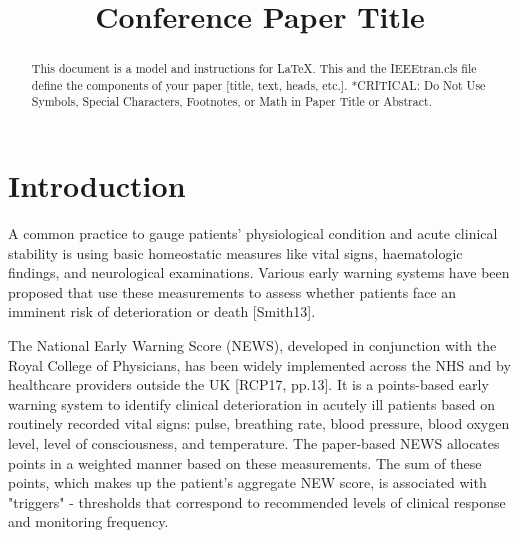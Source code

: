 \documentclass[10pt,journal, compsoc]{IEEEtran}
\begin{document}
\title{Conference Paper Title\\
}
\author{}

\maketitle

\begin{abstract}
    This document is a model and instructions for \LaTeX.
    This and the IEEEtran.cls file define the components of your paper [title, text, heads, etc.]. *CRITICAL: Do Not Use Symbols, Special Characters, Footnotes,
    or Math in Paper Title or Abstract.
\end{abstract}

\section{Introduction}
A common practice to gauge patients' physiological condition and acute clinical stability is using basic homeostatic measures like vital signs, haematologic findings, and neurological examinations. Various early warning systems have been proposed that use these measurements to assess whether patients face an imminent risk of deterioration or death [Smith13].

The National Early Warning Score (NEWS), developed in conjunction with the Royal College of Physicians, has been widely implemented across the NHS and by healthcare providers outside the UK [RCP17, pp.13]. It is a points-based early warning system to identify clinical deterioration in acutely ill patients based on routinely recorded vital signs: pulse, breathing rate, blood pressure, blood oxygen level, level of consciousness, and temperature. The paper-based NEWS allocates points in a weighted manner based on these measurements. The sum of these points, which makes up the patient's aggregate NEW score, is associated with "triggers" - thresholds that correspond to recommended levels of clinical response and monitoring frequency.
\end{document}
